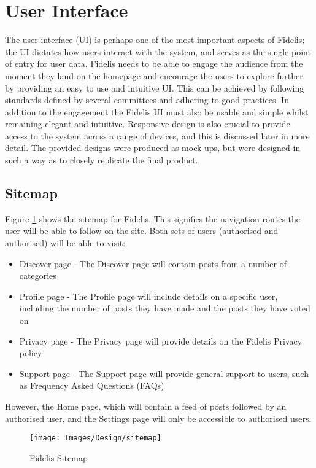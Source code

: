 \section{User Interface}
The user interface (UI) is perhaps one of the most important aspects of Fidelis; the UI dictates how users interact with the system, and serves as the single point of entry for user data. Fidelis needs to be able to engage the audience from the moment they land on the homepage and encourage the users to explore further by providing an easy to use and intuitive UI. This can be achieved by following standards defined by several committees and adhering to good practices. In addition to the engagement the Fidelis UI must also be usable and simple whilst remaining elegant and intuitive. Responsive design is also crucial to provide access to the system across a range of devices, and this is discussed later in more detail. The provided designs were produced as mock-ups, but were designed in such a way as to closely replicate the final product.

\subsection{Sitemap}
Figure \ref{fig:sitemap} shows the sitemap for Fidelis. This signifies the navigation routes the user will be able to follow on the site. Both sets of users (authorised and authorised) will be able to visit:
\begin{itemize}
\item Discover page - The Discover page will contain posts from a number of categories
\item Profile page - The Profile page will include details on a specific user, including the number of posts they have made and the posts they have voted on
\item Privacy page - The Privacy page will provide details on the Fidelis Privacy policy
\item Support page - The Support page will provide general support to users, such as Frequency Asked Questions (FAQs)
\end{itemize}

However, the Home page, which will contain a feed of posts followed by an authorised user, and the Settings page will only be accessible to authorised users.

\begin{figure}
\centering
\texttt{[image: Images/Design/sitemap]}
\label{fig:sitemap}
\caption{Fidelis Sitemap}
\end{figure}

